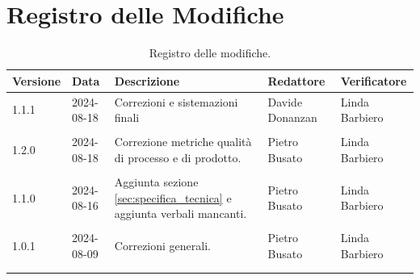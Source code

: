 \documentclass[8pt]{article}
\begin{document}
\section*{Registro delle Modifiche}
\begin{table}[ht!]
    \hypersetup{hidelinks}	
	\centering
	\begin{tabular}{p{1.2cm} p{2cm} p{5cm} p{3cm} p{3cm}}
		\toprule
		\textbf{Versione}& \textbf{Data} & \textbf{Descrizione} & \textbf{Redattore} & \textbf{Verificatore} \\
		\midrule
            1.1.1 & 2024-08-18 & Correzioni e sistemazioni finali & Davide Donanzan & Linda Barbiero \\\\
            1.2.0 & 2024-08-18 & Correzione metriche qualità di processo e di prodotto. & Pietro Busato & Linda Barbiero \\\\
            1.1.0 & 2024-08-16 & Aggiunta sezione \ref{sec:specifica_tecnica} e aggiunta verbali mancanti. & Pietro Busato & Linda Barbiero \\\\
			1.0.1 & 2024-08-09 & Correzioni generali. & Pietro Busato & Linda Barbiero \\\\
 		    \\ %
		\bottomrule
	\end{tabular}
	\caption{Registro delle modifiche.}
	\label{table:Registro delle modifiche}
\end{table}
\clearpage
\end{document}
